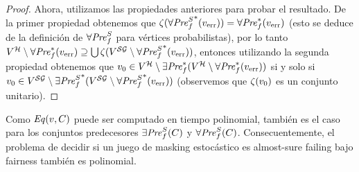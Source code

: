 \begin{proof}
       
       Ahora, utilizamos las propiedades anteriores para probar el resultado. De la primer propiedad obtenemos que $\zeta({\forall\mathit{Pre}^S_f}^*(v_{\text{err}})) = \forall\mathit{Pre}_f^*(v_{\text{err}})$ (esto se deduce de la definición de $\forall\mathit{Pre}^S_f$ para vértices probabilistas),  
       por lo tanto $V^{\mathcal{H}} \setminus \forall\mathit{Pre}_f^*(v_{\text{err}}) \supseteq \bigcup \zeta(V^{\mathcal{SG}} \setminus {\forall\mathit{Pre}^S_f}^*(v_{\text{err}}))$, entonces utilizando la segunda propiedad obtenemos que $v_0 \in V^{\mathcal{H}} \setminus \exists\mathit{Pre}_f^*(V^{\mathcal{H}} \setminus \forall\mathit{Pre}_f^*(v_{\text{err}}))$ si y solo si   
       $v_0 \in V^{\mathcal{SG}} \setminus {\exists\mathit{Pre}^S_f}^*(V^{\mathcal{SG}} \setminus {\forall\mathit{Pre}^S_f}^*(v_{\text{err}}))$ (observemos que $\zeta(v_0)$ es un conjunto unitario).
\end{proof}

Como $\mathit{Eq}(v,C)$ puede ser computado en tiempo polinomial, también es el caso para los conjuntos predecesores $\exists\mathit{Pre}^S_f(C)$ y $\forall\mathit{Pre}^S_f(C)$.  Consecuentemente, el problema de decidir si un juego de masking estocástico es almost-sure failing bajo fairness también es polinomial.

